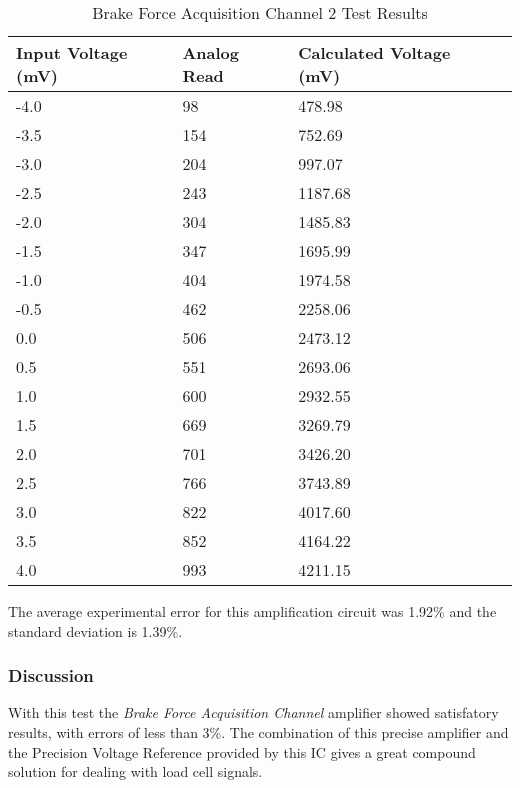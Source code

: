 				\begin{table}[h!]
					\begin{tabular}{|l|l|l|l|}
						\hline
						\textbf{Input Voltage (mV)} & \textbf{Analog Read} & \textbf{Calculated Voltage (mV)} \\ \hline
						-4.0 & 98 & 478.98 \\ \hline
						-3.5 & 154 & 752.69 \\ \hline
						-3.0 & 204 & 997.07 \\ \hline
						-2.5 & 243 & 1187.68 \\ \hline
						-2.0 & 304 & 1485.83 \\ \hline
						-1.5 & 347 & 1695.99 \\ \hline
						-1.0 & 404 & 1974.58 \\ \hline
						-0.5 & 462 & 2258.06 \\ \hline
						 0.0 & 506 & 2473.12 \\ \hline
						 0.5 & 551 & 2693.06 \\ \hline
						 1.0 & 600 & 2932.55 \\ \hline
						 1.5 & 669 & 3269.79 \\ \hline
						 2.0 & 701 & 3426.20 \\ \hline
						 2.5 & 766 & 3743.89 \\ \hline
						 3.0 & 822 & 4017.60 \\ \hline
						 3.5 & 852 & 4164.22 \\ \hline
						 4.0 & 993 & 4211.15 \\ \hline
					\end{tabular}
					\caption{Brake Force Acquisition Channel 2 Test Results}
					\label{table:results-load2-test}
				\end{table}

			The average experimental error for this amplification circuit was 1.92$\%$ and the standard deviation is 1.39$\%$. 
		

	\subsubsection{Discussion}

		With this test the \textit{Brake Force Acquisition Channel} amplifier showed satisfatory results, with errors of less than 3$\%$. The combination of this precise amplifier and the Precision Voltage Reference provided by this IC gives a great compound solution for dealing with load cell signals.
